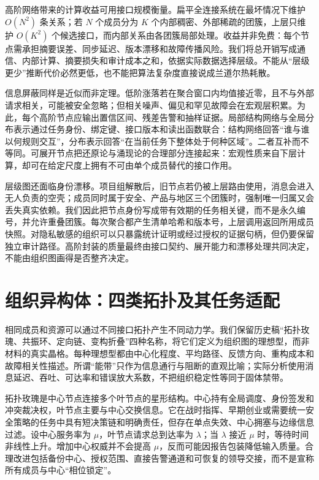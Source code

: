 高阶网络带来的计算收益可用接口规模衡量。扁平全连接系统在最坏情况下维护 $O(N^2)$ 条关系；若 $N$ 个成员分为 $K$ 个内部稠密、外部稀疏的团簇，上层只维护 $O(K^2)$ 个候选接口，而内部关系由各团簇局部处理。收益并非免费：每个节点需承担摘要误差、同步延迟、版本漂移和故障传播风险。我们将总开销写成通信、内部计算、摘要损失和审计成本之和，依据实际数据选择层级。不能从“层级更少”推断代价必然更低，也不能把算法复杂度直接说成兰道尔热耗散。

信息屏蔽同样是近似而非定理。低阶涨落若在聚合窗口内均值接近零，且不与外部请求相关，可能被安全忽略；但相关噪声、偏见和罕见故障会在宏观层积累。为此，每个高阶节点应输出置信区间、残差告警和抽样证据。局部结构网络与全局分布表示通过任务身份、绑定键、接口版本和读出函数联合：结构网络回答“谁与谁以何规则交互”，分布表示回答“在当前任务下整体处于何种区域”。二者互补而不等同。可展开节点把还原论与涌现论的合理部分连接起来：宏观性质来自下层计算，却可在给定尺度上拥有不可由单个成员替代的接口作用。

层级图还面临身份漂移。项目组解散后，旧节点若仍被上层路由使用，消息会进入无人负责的空壳；成员同时属于安全、产品与地区三个团簇时，强制唯一归属又会丢失真实依赖。我们因此把节点身份写成带有效期的任务相关键，而不是永久编号，并允许重叠团簇。每次聚合都产生清单哈希和版本号，上层调用返回所用成员快照。对隐私敏感的组织可以只暴露统计证明或经过授权的证据句柄，但仍要保留独立审计路径。高阶封装的质量最终由接口契约、展开能力和漂移处理共同决定，不能由组织图画得是否整齐决定。

\section{组织异构体：四类拓扑及其任务适配}
\label{sec:section_3228}

相同成员和资源可以通过不同接口拓扑产生不同动力学。我们保留历史稿“拓扑玫瑰、共振环、定向链、变构折叠”四种名称，将它们定义为组织图的理想型，而非材料的真实晶格。每种理想型都由中心化程度、平均路径、反馈方向、重构成本和故障相关性描述。所谓“能带”只作为信息通行与阻断的直观比喻；实际分析使用消息延迟、吞吐、可达率和错误放大系数，不把组织稳定性等同于固体禁带。

拓扑玫瑰是中心节点连接多个叶节点的星形结构。中心持有全局调度、身份签发和冲突裁决权，叶节点主要与中心交换信息。它在战时指挥、早期创业或需要统一安全策略的任务中具有短决策链和明确责任，但存在单点失效、中心拥塞与边缘信息过滤。设中心服务率为 $\mu$，叶节点请求总到达率为 $\lambda$；当 $\lambda$ 接近 $\mu$ 时，等待时间非线性上升。增加中心权威并不会提高 $\mu$，反而可能因报告包装降低输入质量。合理改进包括备份中心、授权范围、直接告警通道和可恢复的领导交接，而不是宣称所有成员与中心“相位锁定”。

